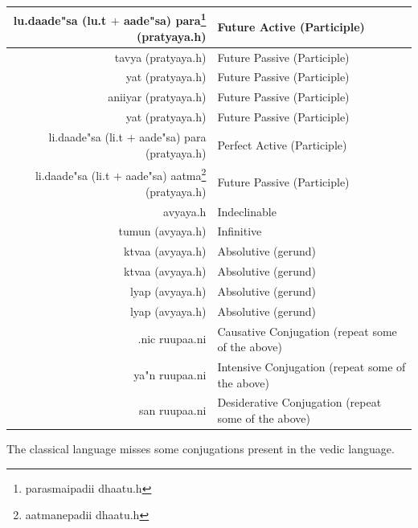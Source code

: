 \documentclass[a4paper, 12pt]{article}
\newcommand \sans[1]{
    \textsanskrit{#1}
}
\begin{document}
\begin{table}[h!]
\begin{center}
\begin{longtable}{|r|l|}
    \hline
    \sans{lu.daade"sa (lu.t $+$ aade"sa) para\footnote{\sans{parasmaipadii dhaatu.h}} (pratyaya.h)} &
    Future Active (Participle)\\
    \hline
    \sans{tavya (pratyaya.h)} &
    Future Passive (Participle)\\
    \hline
    \sans{yat (pratyaya.h)} &
    Future Passive (Participle)\\
    \hline
    \sans{aniiyar (pratyaya.h)} &
    Future Passive (Participle)\\
    \hline
    \sans{yat (pratyaya.h)} &
    Future Passive (Participle)\\
    \hline
    \sans{li.daade"sa (li.t $+$ aade"sa) para (pratyaya.h)} &
    Perfect Active (Participle)\\
    \hline
    \sans{li.daade"sa (li.t $+$ aade"sa) aatma\footnote{\sans{aatmanepadii dhaatu.h}} (pratyaya.h)} &
    Future Passive (Participle)\\
    \hline
    \sans{avyaya.h} &
    Indeclinable\\
    \hline
    \sans{tumun (avyaya.h)} &
    Infinitive\\
    \hline
    \sans{ktvaa (avyaya.h)} &
    Absolutive (gerund)\\
    \hline
    \sans{ktvaa (avyaya.h)} &
    Absolutive (gerund)\\
    \hline
    \sans{lyap (avyaya.h)} &
    Absolutive (gerund)\\
    \hline
    \sans{lyap (avyaya.h)} &
    Absolutive (gerund)\\
    \hline
    \sans{.nic ruupaa.ni} &
    Causative Conjugation (repeat some of the above)\\
    \hline
    \sans{ya"n ruupaa.ni} &
    Intensive Conjugation (repeat some of the above)\\
    \hline
    \sans{san ruupaa.ni} &
    Desiderative Conjugation (repeat some of the above)\\
    \hline
\end{longtable}
\end{center}
\end{table}

The classical language misses some conjugations present in the vedic language.
\end{document}
